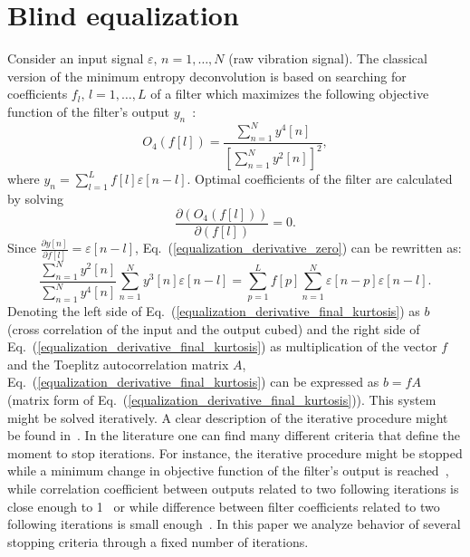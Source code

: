 \section{Blind equalization}\label{methodology_equalization}
Consider an input signal $\varepsilon,\,n=1,\ldots,N$ (raw vibration signal). The classical version of the minimum entropy deconvolution is based on searching for coefficients $f_l,\, l=1,\ldots,L$ of a filter which maximizes the following objective function of the filter's output $y_n$~\cite{Wiggins197821}:
\begin{equation}
O_4\left(f\left[l\right]\right)=\frac{\sum\limits_{n=1}^{N} y^4[n]}{\left[\sum\limits_{n=1}^{N} y^2[n]\right]^2},
\label{equalization_KURTOSIScriterion}
\end{equation}
where $y_n=\sum\limits_{l=1}^{L} f[l]\varepsilon [n-l]$. Optimal coefficients of the filter are calculated by solving
\begin{equation}
\frac{\partial \left(O_4\left(f\left[l\right]\right)\right)}{\partial \left(f[l]\right)}=0.
\label{equalization_derivative_zero}
\end{equation}
Since $\frac{\partial y[n]}{\partial f[l]}=\varepsilon[n-l]$, Eq.~(\ref{equalization_derivative_zero}) can be rewritten as:
\begin{equation}
\frac{\sum\limits_{n=1}^{N} y^2[n]}{\sum\limits_{n=1}^{N} y^4[n]}\sum\limits_{n=1}^{N} y^3[n]\varepsilon[n-l]=\sum\limits_{p=1}^{L} f[p] \sum\limits_{n=1}^{N} \varepsilon[n-p]\varepsilon[n-l].
\label{equalization_derivative_final_kurtosis}
\end{equation}
Denoting the left side of Eq.~(\ref{equalization_derivative_final_kurtosis}) as $b$ (cross correlation of the input and the output cubed) and the right side of Eq.~(\ref{equalization_derivative_final_kurtosis}) as multiplication of the vector $f$ and the Toeplitz autocorrelation matrix $A$, Eq.~(\ref{equalization_derivative_final_kurtosis}) can be expressed as $b=fA$ (matrix form of Eq.~(\ref{equalization_derivative_final_kurtosis})). This system might be solved iteratively. A clear description of the iterative procedure might be found in~\cite{Wiggins197821,Endo2007906}. In the literature one can find many different criteria that define the moment to stop iterations. For instance, the iterative procedure might be stopped while a minimum change in objective function of the filter's output is reached~\cite{McDonald2012237}, while correlation coefficient between outputs related to two following iterations is close enough to 1~\cite{Broadhead2000885} or while difference between filter coefficients related to two following iterations is small enough~\cite{Endo2007906}. In this paper we analyze behavior of several stopping criteria through a fixed number of iterations.\\

